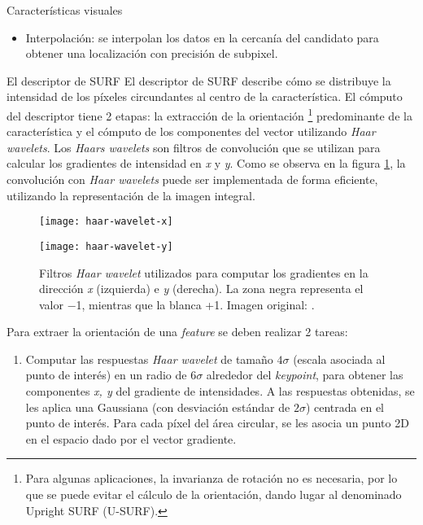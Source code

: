 \begin{section}{Características visuales}
\begin{subsection}
\begin{subsection}
\begin{itemize}
\item Interpolación: se interpolan los datos en la cercanía del candidato para obtener una localización con precisión de subpixel.

\end{itemize}
\end{subsection}

\begin{subsection}
{El descriptor de SURF}
El descriptor de SURF describe cómo se distribuye la intensidad de los píxeles circundantes al centro de la característica. El cómputo del descriptor tiene 2 etapas: la extracción de la orientación
\footnote{Para algunas aplicaciones, la invarianza de rotación no es necesaria, por lo que se puede evitar el cálculo de la orientación, dando lugar al denominado Upright SURF (U-SURF).}
predominante de la característica y el cómputo de los componentes del vector utilizando \textit{Haar wavelets}. Los \textit{Haars wavelets} son filtros de convolución que se utilizan para calcular los gradientes de intensidad en \textit{x} y \textit{y}. Como se observa en la figura \ref{fig:haar-wavelet}, la convolución con \textit{Haar wavelets} puede ser implementada de forma eficiente, utilizando la representación de la imagen integral.

\begin{figure}[ht]
\centering
\begin{minipage}[h]{.45\textwidth}
\begin{center}
\texttt{[image: haar-wavelet-x]}
\end{center}
\end{minipage}
\hfill
\begin{minipage}[h]{.45\textwidth}
\begin{center}
\texttt{[image: haar-wavelet-y]}
\end{center}
\end{minipage}
\hfill
\caption[Haar wavelet]{Filtros \textit{Haar wavelet} utilizados para computar los gradientes en la dirección \textit{x} (izquierda) e \textit{y} (derecha). La zona negra representa el valor −1, mientras que la blanca +1. Imagen original: \cite{bay2008speeded}.}
\label{fig:haar-wavelet}
\end{figure}

Para extraer la orientación de una \textit{feature} se deben realizar 2 tareas:
\begin{enumerate}

\item Computar las respuestas \textit{Haar wavelet} de tamaño $4\sigma$ (escala asociada al punto de interés) en un radio de $6\sigma$ alrededor del \textit{keypoint}, para obtener las componentes \textit{x, y} del gradiente de intensidades. A las respuestas obtenidas, se les aplica una Gaussiana (con desviación estándar de $2\sigma$) centrada en el punto de interés. Para cada píxel del área circular, se les asocia un punto 2D en el espacio dado por el vector gradiente.


\end{enumerate}
\end{subsection}
\end{subsection}
\end{section}
